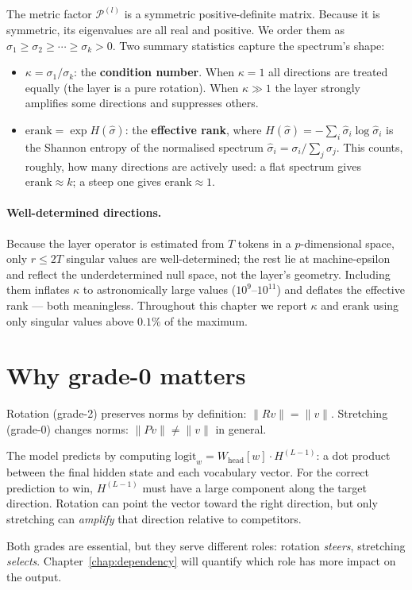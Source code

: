 \documentclass[11pt, twoside, openright]{memoir}
\newcommand{\metric}[1]{\mathcal{P}^{(#1)}} %
\numberwithin{equation}{chapter}
\begin{document}
The metric factor $\metric{l}$ is a symmetric positive-definite matrix.
Because it is symmetric, its eigenvalues are all real and positive.  We
order them as $\sigma_1 \geq \sigma_2 \geq \cdots \geq \sigma_k > 0$.
Two summary statistics capture the spectrum's shape:

\begin{itemize}[nosep]
\item $\kappa = \sigma_1 / \sigma_k$: the \textbf{condition number}.
  When $\kappa = 1$ all directions are treated equally (the layer is a
  pure rotation).  When $\kappa \gg 1$ the layer strongly amplifies
  some directions and suppresses others.
\item $\mathrm{erank} = \exp H(\hat{\sigma})$: the \textbf{effective
  rank}, where $H(\hat{\sigma}) = -\sum_i \hat{\sigma}_i \log
  \hat{\sigma}_i$ is the Shannon entropy of the normalised spectrum
  $\hat{\sigma}_i = \sigma_i / \sum_j \sigma_j$.  This counts,
  roughly, how many directions are actively used: a flat spectrum gives
  $\mathrm{erank} \approx k$; a steep one gives $\mathrm{erank}
  \approx 1$.
\end{itemize}

\paragraph{Well-determined directions.}
Because the layer operator is estimated from $T$ tokens in a
$p$-dimensional space, only $r \leq 2T$ singular values are
well-determined; the rest lie at machine-epsilon and reflect the
underdetermined null space, not the layer's geometry.
Including them inflates $\kappa$ to astronomically large values
($10^{9}$--$10^{11}$) and deflates the effective rank --- both
meaningless.  Throughout this chapter we report $\kappa$ and
$\mathrm{erank}$ using only singular values above $0.1\%$ of the
maximum.

\section{Why grade-0 matters}

\begin{keyidea}
Rotation (grade-2) preserves norms by definition: $\|Rv\| = \|v\|$.
Stretching (grade-0) changes norms: $\|Pv\| \neq \|v\|$ in general.

The model predicts by computing $\mathrm{logit}_w = W_{\mathrm{head}}[w]
\cdot H^{(L-1)}$: a dot product between the final hidden state and each
vocabulary vector.  For the correct prediction to win, $H^{(L-1)}$ must
have a large component along the target direction.  Rotation can point the
vector toward the right direction, but only stretching can
\emph{amplify} that direction relative to competitors.

Both grades are essential, but they serve different roles: rotation
\emph{steers}, stretching \emph{selects}.  Chapter~\ref{chap:dependency}
will quantify which role has more impact on the output.
\end{keyidea}
\end{document}

